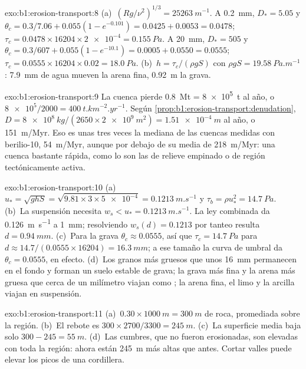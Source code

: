 \begin{solution}{exo:b1:erosion-transport:8}
(a)~$(Rg/\nu^2)^{1/3} = \qty{25263}{m^{-1}}$. A \qty{0.2}{mm}, $D_* = 5.05$
y $\theta_c = 0.3/7.06 + 0.055(1 - e^{-0.101}) = 0.0425 + 0.0053 =
0.0478$; $\tau_c = 0.0478 \times 16204 \times \num{2e-4} = \qty{0.155}{Pa}$.
A \qty{20}{mm}, $D_* = 505$ y $\theta_c = 0.3/607 + 0.055(1 - e^{-10.1}) =
0.0005 + 0.0550 = 0.0555$; $\tau_c = 0.0555 \times 16204 \times 0.02 =
\qty{18.0}{Pa}$. (b)~$h = \tau_c/(\rho g S)$ con $\rho g S =
\qty{19.58}{Pa.m^{-1}}$: \qty{7.9}{mm} de agua mueven la arena fina, \qty{0.92}{m}
la grava.
\end{solution}

\begin{solution}{exo:b1:erosion-transport:9}
La cuenca pierde \qty{0.8}{Mt} = \qty{8e5}{t} al año, o $\num{8e5}/2000 =
\qty{400}{t.km^{-2}.yr^{-1}}$. Según \cref{prop:b1:erosion-transport:denudation},
$D = \qty{8e8}{kg}/(2650 \times \qty{2e9}{m^2}) = \qty{1.51e-4}{m}$ al año, o
\qty{151}{m/Myr}. Eso es unas tres veces la mediana de las cuencas medidas
con berilio-10, \qty{54}{m/Myr}, aunque por debajo de su media de
\qty{218}{m/Myr}: una cuenca bastante rápida, como lo son las de relieve empinado o de región tectónicamente activa.
\end{solution}

\begin{solution}{exo:b1:erosion-transport:10}
(a)~$u_* = \sqrt{g h S} = \sqrt{9.81 \times 3 \times \num{5e-4}} =
\qty{0.1213}{m.s^{-1}}$ y $\tau_b = \rho u_*^2 = \qty{14.7}{Pa}$.
(b)~La suspensión necesita $w_s < u_* = \qty{0.1213}{m.s^{-1}}$. La ley combinada
da \qty{0.126}{m.s^{-1}} a \qty{1}{mm}; resolviendo
$w_s(d) = 0.1213$ por tanteo resulta $d = \qty{0.94}{mm}$. (c)~Para la grava
$\theta_c \approx 0.0555$, así que $\tau_c = \qty{14.7}{Pa}$ para $d \approx
14.7/(0.0555 \times 16204) = \qty{16.3}{mm}$; a ese tamaño la curva de umbral da
$\theta_c = 0.0555$, en efecto. (d)~Los granos más gruesos que unos \qty{16}{mm} permanecen en el fondo y forman un suelo estable de grava; la grava más fina y la arena
más gruesa que cerca de un milímetro viajan como ; la arena fina, el limo y la arcilla viajan en suspensión.
\end{solution}

\begin{solution}{exo:b1:erosion-transport:11}
(a)~$0.30 \times \qty{1000}{m} = \qty{300}{m}$ de roca, promediada sobre la región. (b)~El rebote es $300 \times 2700/3300 = \qty{245}{m}$. (c)~La superficie media
baja solo $300 - 245 = \qty{55}{m}$. (d)~Las cumbres, que no fueron erosionadas, son elevadas con toda la región: ahora están
\qty{245}{m} más altas que antes. Cortar valles puede elevar los picos de una cordillera.
\end{solution}

